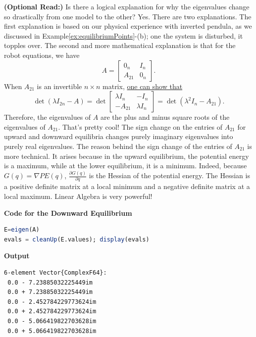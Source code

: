 \textbf{(Optional Read:)} Is there a logical explanation for why the eigenvalues change so drastically from one model to the other? Yes. There are two explanations. The first explanation is based on our physical experience with inverted pendula, as we discussed in Example\ref{ex:equilibriumPoints}-(b); one the system is disturbed, it topples over. The second and more mathematical explanation is that for the robot equations, we have
\[ A = \begin{bmatrix} 0_n & I_n \\ A_{21} & 0_n \end{bmatrix}. \]
When \( A_{21} \) is an invertible \( n \times n \) matrix, 
\href{https://math.stackexchange.com/questions/262563/eigenvalues-of-block-matrices-with-zero-diagonal-blocks}{one can show that}
\[ \det(\lambda I_{2n}- A ) = \det\begin{bmatrix} \lambda I_n & -I_n \\ -A_{21} & \lambda I_n \end{bmatrix} = \det(\lambda^2 I_n - A_{21}). \]
Therefore, the eigenvalues of \( A \) are the plus and minus square roots of the eigenvalues of \( A_{21} \). That's pretty cool! The sign change on the entries of $A_{21}$ for upward and downward equilibria changes purely imaginary eigenvalues into purely real eigenvalues. The reason behind the sign change of the entries of $A_{21}$ is more technical. It arises because in the upward equilibrium, the potential energy is a maximum, while at the lower equilibrium, it is a minimum. Indeed, because $G(q) = \nabla PE(q)$, $\frac{\partial G(q)}{\partial q}$ is the Hessian of the potential energy. The Hessian is a positive definite matrix at a local minimum and a negative definite matrix at a local maximum. Linear Algebra is very powerful!\\


\vspace*{.4cm}

\textbf{Code for the Downward Equilibrium}
\begin{lstlisting}[language=Julia,style=mystyle]
E=eigen(A)
evals = cleanUp(E.values); display(evals)
\end{lstlisting}
\textbf{Output} 
\begin{verbatim}
6-element Vector{ComplexF64}:
 0.0 - 7.23885032225449im
 0.0 + 7.23885032225449im
 0.0 - 2.452784229773624im
 0.0 + 2.452784229773624im
 0.0 - 5.066419822703628im
 0.0 + 5.066419822703628im
\end{verbatim}

